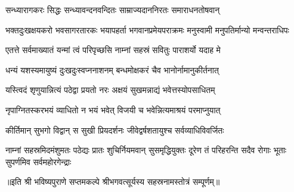 \twolineshloka
{सन्ध्यारागकरः सिद्धः सन्ध्यावन्दनवन्दितः}
{साम्राज्यदाननिरतः समाराधनतोषवान्}%

\threelineshloka
{भक्तदुःखक्षयकरो भवसागरतारकः}
{भयापहर्ता भगवानप्रमेयपराक्रमः}
{मनुस्वामी मनुपतिर्मान्यो मन्वन्तराधिपः}%

\resetShloka
\twolineshloka
{एतत्ते सर्वमाख्यातं यन्मां त्वं परिपृच्छसि}
{नाम्नां सहस्रं सवितुः पाराशर्यो यदाह मे}

\twolineshloka
{धन्यं यशस्यमायुष्यं दुःखदुःस्वप्ननाशनम्}
{बन्धमोक्षकरं चैव भानोर्नामानुकीर्तनात्}

\twolineshloka
{यस्त्विदं शृणुयान्नित्यं पठेद्वा प्रयतो नरः}
{अक्षयं सुखमन्नाद्यं भवेत्तस्योपसाधितम्}

\twolineshloka
{नृपाग्नितस्करभयं व्याधितो न भयं भवेत्}
{विजयी च भवेन्नित्यमाश्रयं परमाप्नुयात्}

\twolineshloka
{कीर्तिमान् सुभगो विद्वान् स सुखी प्रियदर्शनः}
{जीवेद्वर्षशतायुश्च सर्वव्याधिविवर्जितः}

\fourlineindentedshloka
{नाम्नां सहस्रमिदमंशुमतः पठेद्यः}
{प्रातः शुचिर्नियमवान् सुसमृद्धियुक्तः}
{दूरेण तं परिहरन्ति सदैव रोगाः}
{भूताः सुपर्णमिव सर्वमहोरगेन्द्राः}

॥इति श्री भविष्यपुराणे सप्तमकल्पे श्रीभगवत्सूर्यस्य सहस्रनामस्तोत्रं सम्पूर्णम्॥